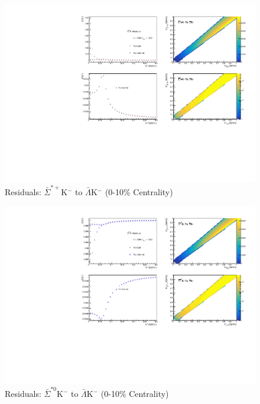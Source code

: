 \documentclass[../AnalysisNoteJBuxton.tex]{subfiles}
\begin{document}
\begin{figure}[h]
  \centering
  \includegraphics[width=\textwidth]{9_AdditionalFigures/Figures/Residuals/ALamKchM/Residuals_ALamKchM_0010_ASigStPKchM_MomResCrctn_NonFlatBgdCrctn_10Res_PrimMaxDecay4fm_UsingXiDataAndCoulombOnly.pdf}
  \caption[Residuals: $\bar{\Sigma}^{*+}$K$^{-}$ to $\bar{\Lambda}$K$^{-}$ (0-10\% Centrality)]{Residuals: $\bar{\Sigma}^{*+}$K$^{-}$ to $\bar{\Lambda}$K$^{-}$ (0-10\% Centrality)}
  \label{fig:Res_ALamKchM_0010_ASigStPKchM}
\end{figure}

\begin{figure}[h]
  \centering
  \includegraphics[width=\textwidth]{9_AdditionalFigures/Figures/Residuals/ALamKchM/Residuals_ALamKchM_0010_ASigSt0KchM_MomResCrctn_NonFlatBgdCrctn_10Res_PrimMaxDecay4fm_UsingXiDataAndCoulombOnly.pdf}
  \caption[Residuals: $\bar{\Sigma}^{*0}$K$^{-}$ to $\bar{\Lambda}$K$^{-}$ (0-10\% Centrality)]{Residuals: $\bar{\Sigma}^{*0}$K$^{-}$ to $\bar{\Lambda}$K$^{-}$ (0-10\% Centrality)}
  \label{fig:Res_ALamKchM_0010_ASigSt0KchM}
\end{figure}
\end{document}
